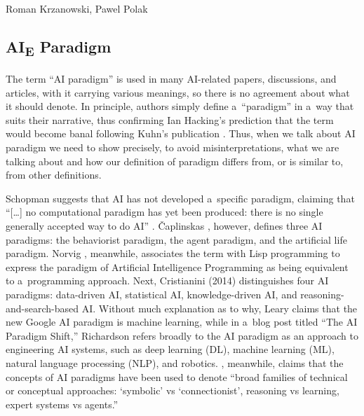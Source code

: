 \begin{artengenv2auth}{Roman Krzanowski, Pawel Polak}
\subsection*{AI\textsubscript{E} Paradigm}

The term ``AI paradigm'' is used in many AI-related papers, discussions, and articles, with it carrying various meanings, so there is no agreement about what it should denote. In principle, authors simply define a~``paradigm'' in a~way that suits their narrative, thus confirming Ian Hacking's prediction that the term would become banal following Kuhn's publication
\parencite[][]{kuhn_introductory_2012}. %
 Thus, when we talk about AI paradigm we need to show precisely, to avoid misinterpretations, what we are talking about and how our definition of paradigm differs from, or is similar to, from other definitions.

Schopman
\parencite*[][]{schopman_artifical_1986} %
 suggests that AI has not developed a~specific paradigm, claiming that ``[\ldots] no computational paradigm has yet been produced: there is no single generally accepted way to do AI'' 
\parencite[][p.6]{schopman_artifical_1986}. %
 Čaplinskas 
\parencite*[][]{caplinskas_ai_1998}, %
 however, defines three AI paradigms: the behaviorist paradigm, the agent paradigm, and the artificial life paradigm. Norvig 
\parencites*[][]{norvig_paradigms_1992}[][]{norvig_retrospective_2002}, %
 meanwhile, associates the term with Lisp programming to express the paradigm of Artificial Intelligence Programming as being equivalent to a~programming approach. Next, Cristianini (2014) distinguishes four AI paradigms: data-driven AI, statistical AI, knowledge-driven AI, and reasoning-and-search-based AI. Without much explanation as to why, Leary 
\parencite*[][]{leary_googles_2017} %
 claims that the new Google AI paradigm is machine learning, while in a~blog post titled ``The AI Paradigm Shift,'' Richardson 
\parencite*[][]{richardson_ai_2018} %
 refers broadly to the AI paradigm as an approach to engineering AI systems, such as deep learning (DL), machine learning (ML), natural language processing (NLP), and robotics. 
\parencite[][p.2522]{hernandez-orallo_ai_2020}, %
 meanwhile, claims that the concepts of AI paradigms have been used to denote ``broad families of technical or conceptual approaches: ‘symbolic' vs ‘connectionist', reasoning vs learning, expert systems vs agents.''


\end{artengenv2auth}
